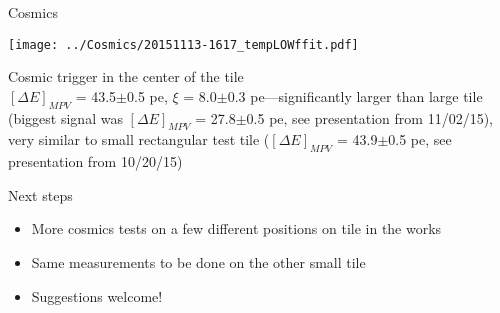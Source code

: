 \documentclass[compress,8pt]{beamer} %
\begin{document}
\begin{frame}{Cosmics}
\begin{adjustwidth}{-3em}{-3em}
\begin{center}
\texttt{[image: ../Cosmics/20151113-1617\_tempLOWffit.pdf]}
\end{center}
\end{adjustwidth}
\vspace{-10pt}
Cosmic trigger in the center of the tile \\
$[\Delta E]_{MPV}$ = 43.5$\pm$0.5 pe, $\xi$ = 8.0$\pm$0.3 pe---significantly
larger than large tile
(biggest signal was $[\Delta E]_{MPV}$ = 27.8$\pm$0.5 pe, see presentation from 11/02/15),
very similar to small rectangular test tile
($[\Delta E]_{MPV}$ = 43.9$\pm$0.5 pe, see presentation from 10/20/15)
\end{frame}



\begin{frame}{Next steps}
\begin{itemize}
\item More cosmics tests on a few different positions on tile in the works
\item Same measurements to be done on the other small tile
\item Suggestions welcome!
\end{itemize}
\end{frame}




\end{document}
